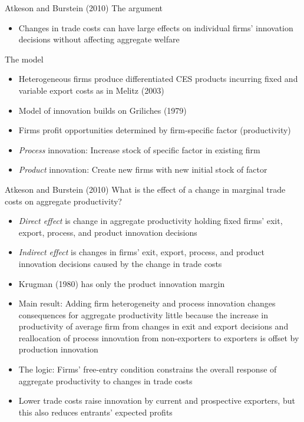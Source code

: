 \documentclass[10pt,notes=hide]{beamer}
\begin{document}
\begin{frame}{Atkeson and Burstein (2010)}
The argument
\begin{itemize}
\item Changes in trade costs can have large effects on individual firms' innovation decisions without affecting aggregate welfare
\end{itemize}
The model
\begin{itemize}
	\item Heterogeneous firms produce differentiated CES products incurring fixed and variable export costs as in Melitz (2003)
	\item Model of innovation builds on Griliches (1979)
	\item Firms profit opportunities determined by firm-specific factor (productivity)
	\item \textit{Process} innovation: Increase stock of specific factor in existing firm
	\item \textit{Product} innovation: Create new firms with new initial stock of factor
\end{itemize}
\end{frame}
\begin{frame}{Atkeson and Burstein (2010)}
What is the effect of a change in marginal trade costs on aggregate productivity?
\begin{itemize}
\item \textit{Direct effect} is change in aggregate productivity holding fixed firms' exit, export, process, and product innovation decisions
\item \textit{Indirect effect} is changes in firms' exit, export, process, and product innovation decisions caused by the change in trade costs
\item Krugman (1980) has only the product innovation margin
\item Main result: Adding firm heterogeneity and process innovation changes consequences for aggregate productivity little because 
the increase in productivity of average firm 
from changes in exit and export decisions and reallocation of process innovation from non-exporters to exporters 
is offset by production innovation
\item The logic: Firms' free-entry condition constrains the overall response of aggregate productivity to changes in trade costs
\item Lower trade costs raise innovation by current and prospective exporters, but this also reduces entrants' expected profits
\end{itemize}
\end{frame}
\end{document}
